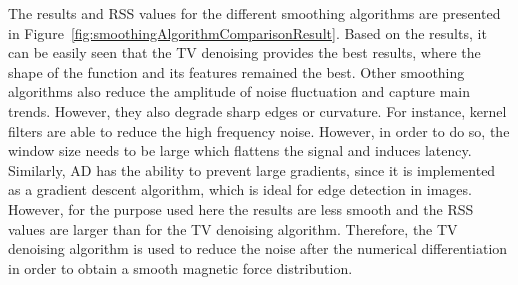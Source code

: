 The results and RSS values for the different smoothing algorithms are presented in Figure~\ref{fig:smoothingAlgorithmComparisonResult}. Based on the results, it can be easily seen that the TV denoising provides the best results, where the shape of the function and its features remained the best. Other smoothing algorithms also reduce the amplitude of noise fluctuation and capture main trends. However, they also degrade sharp edges or curvature. For instance, kernel filters are able to reduce the high frequency noise. However, in order to do so, the window size needs to be large which flattens the signal and induces latency. Similarly, AD has the ability to prevent large gradients, since it is implemented as a gradient descent algorithm, which is ideal for edge detection in images. However, for the purpose used here the results are less smooth and the RSS values are larger than for the TV denoising algorithm. Therefore, the TV denoising algorithm is used to reduce the noise after the numerical differentiation in order to obtain a smooth magnetic force distribution. 

